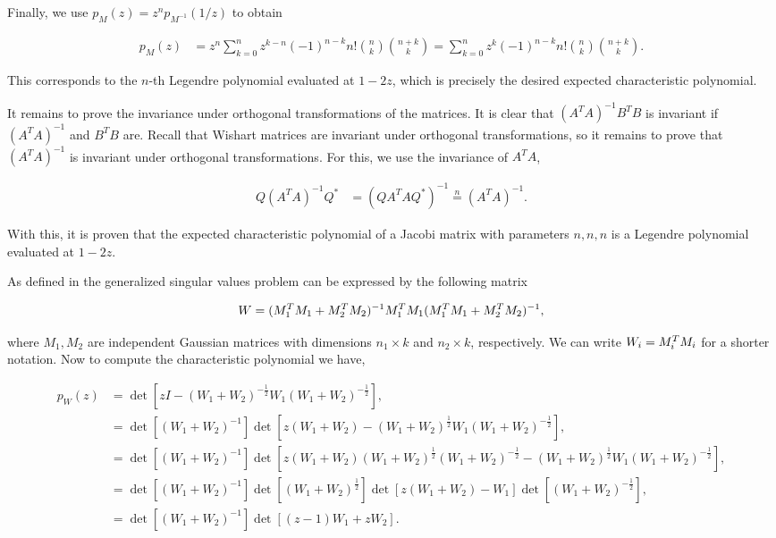 Finally, we use \( p_{M}(z) = z^n p_{M^{-1}}(1/z) \) to obtain

\begin{align*}
    p_{M}(z) &= z^n \sum_{k=0}^n z^{k-n}(-1)^{n-k}n!\binom{n}{k} \binom{n+k}{k} = \sum_{k=0}^n z^{k}(-1)^{n-k}n!\binom{n}{k} \binom{n+k}{k}.
\end{align*}

This corresponds to the \(n\)-th Legendre polynomial evaluated at \( 1-2z \), which is precisely the desired expected characteristic polynomial.

It remains to prove the invariance under orthogonal transformations of the matrices. It is clear that \( (A^TA)^{-1}B^TB \) is invariant if \( (A^TA)^{-1} \) and \( B^TB \) are. Recall that Wishart matrices are invariant under orthogonal transformations, so it remains to prove that \( (A^TA)^{-1} \) is invariant under orthogonal transformations. For this, we use the invariance of \( A^TA \),

\begin{align*}
    Q(A^T A)^{-1}Q^* &= (QA^TAQ^*)^{-1} \overset{n}{=} (A^TA)^{-1}.
\end{align*}

With this, it is proven that the expected characteristic polynomial of a Jacobi matrix with parameters \( n,n,n \) is a Legendre polynomial evaluated at \( 1-2z \).

As defined in \cite{doumerc2005matrices} the generalized singular values problem can be expressed by the following matrix

\begin{equation*}
    W = (M_1^TM_1 + M_2^TM_2)^{-1}M_1^TM_1(M_1^TM_1 + M_2^TM_2)^{-1},
\end{equation*}

\noindent where $M_1, M_2$ are independent Gaussian matrices with dimensions $n_1\times k$ and $n_2 \times k$, respectively.  We can write $W_i = M_i^TM_i$ for a shorter notation. Now to compute the characteristic polynomial we have,

\begin{align*}
    p_W(z) &= \det\left[ zI - (W_1+W_2)^{-\frac12}W_1(W_1+W_2)^{-\frac12} \right], \\ 
    &= \det\left[(W_1+W_2)^{-1}\right]\det\left[ z(W_1+W_2) - (W_1+W_2)^{\frac12}W_1(W_1+W_2)^{-\frac12} \right],\\ 
    &= \det\left[(W_1+W_2)^{-1}\right]\det\left[ z(W_1+W_2)(W_1+W_2)^{\frac12}(W_1+W_2)^{-\frac12} - (W_1+W_2)^{\frac12}W_1(W_1+W_2)^{-\frac12} \right], \\
    &= \det\left[(W_1+W_2)^{-1}\right]\det\left[(W_1+W_2)^{\frac12}\right]\det\left[ z(W_1 + W_2) - W_1\right]\det\left[(W_1+W_2)^{-\frac12}\right],\\ 
    &= \det\left[(W_1+W_2)^{-1}\right]\det\left[ (z-1)W_1 + zW_2 \right].
\end{align*}

